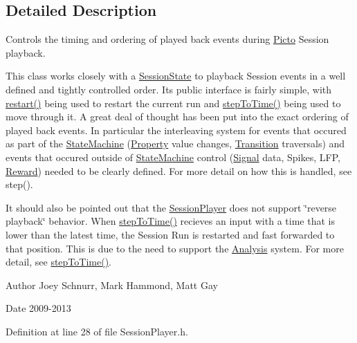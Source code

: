 \subsection{Detailed Description}
Controls the timing and ordering of played back events during \hyperlink{namespace_picto}{Picto} Session playback. 

This class works closely with a \hyperlink{class_picto_1_1_session_state}{Session\-State} to playback Session events in a well defined and tightly controlled order. Its public interface is fairly simple, with \hyperlink{class_picto_1_1_session_player_ab8096bcc250a2bc24c1b4509816f2da6}{restart()} being used to restart the current run and \hyperlink{class_picto_1_1_session_player_a6ac568dc380670485040937b9cc9e85c}{step\-To\-Time()} being used to move through it. A great deal of thought has been put into the exact ordering of played back events. In particular the interleaving system for events that occured as part of the \hyperlink{class_picto_1_1_state_machine}{State\-Machine} (\hyperlink{class_picto_1_1_property}{Property} value changes, \hyperlink{class_picto_1_1_transition}{Transition} traversals) and events that occured outside of \hyperlink{class_picto_1_1_state_machine}{State\-Machine} control (\hyperlink{class_picto_1_1_signal}{Signal} data, Spikes, L\-F\-P, \hyperlink{class_picto_1_1_reward}{Reward}) needed to be clearly defined. For more detail on how this is handled, see step().

It should also be pointed out that the \hyperlink{class_picto_1_1_session_player}{Session\-Player} does not support \char`\"{}reverse playback\char`\"{} behavior. When \hyperlink{class_picto_1_1_session_player_a6ac568dc380670485040937b9cc9e85c}{step\-To\-Time()} recieves an input with a time that is lower than the latest time, the Session Run is restarted and fast forwarded to that position. This is due to the need to support the \hyperlink{class_picto_1_1_analysis}{Analysis} system. For more detail, see \hyperlink{class_picto_1_1_session_player_a6ac568dc380670485040937b9cc9e85c}{step\-To\-Time()}.

\begin{DoxyAuthor}{Author}
Joey Schnurr, Mark Hammond, Matt Gay 
\end{DoxyAuthor}
\begin{DoxyDate}{Date}
2009-\/2013 
\end{DoxyDate}


Definition at line 28 of file Session\-Player.\-h.



